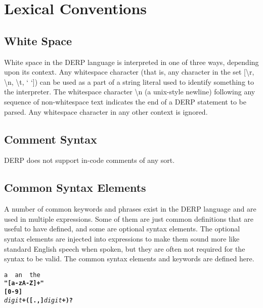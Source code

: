 \section{Lexical Conventions}

\subsection{White Space}
White space in the DERP language is interpreted in one of three ways,
depending upon its context. Any whitespace character (that is, any
character in the set [\textbackslash r, \textbackslash n, \textbackslash t, ‘ ‘]) can be used as a part of a
string literal used to identify something to the interpreter.
The whitespace character \textbackslash n (a unix-style newline) following any sequence
of non-whitespace text indicates the end of a DERP statement to be parsed.
Any whitespace character in any other context is ignored.


\subsection{Comment Syntax}
DERP does not support in-code comments of any sort.

\subsection{Common Syntax Elements}
A number of common keywords and phrases exist in the DERP language and are
used in multiple expressions. Some of them are just common definitions that
are useful to have defined, and some are optional syntax elements.
The optional syntax elements are injected into expressions to make them
sound more like standard English speech when spoken, but they are often not
required for the syntax to be valid. The common syntax elements and keywords
are defined here.

\begin{description}[labelindent=1cm,leftmargin=\onelen,labelwidth=1cm]
     \texttt{a \textbf{\textbar} an \textbf{\textbar} the}\\
     \texttt{\textbf{"[a-zA-Z]+"}}\\
     \texttt{\textbf{[0-9]}}\\
     \texttt{\textit{digit}\textbf{+([.,]}\textit{digit}\textbf{+)?}}\\
\end{description}
